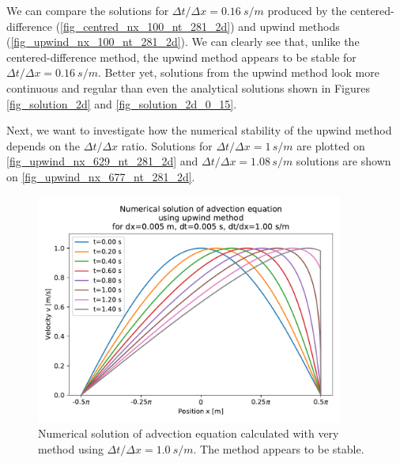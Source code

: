 We can compare the solutions for $\Delta t / \Delta x = 0.16 \ s/m$ produced by the centered-difference (\autoref{fig_centred_nx_100_nt_281_2d}) and upwind methods (\autoref{fig_upwind_nx_100_nt_281_2d}). We can clearly see that, unlike the centered-difference method, the upwind method appears to be stable for $\Delta t / \Delta x = 0.16 \ s/m$. Better yet, solutions from the upwind method look more continuous and regular than even the analytical solutions shown in Figures \ref{fig_solution_2d} and \ref{fig_solution_2d_0_15}.

Next, we want to investigate how the numerical stability of the upwind method depends on the $\Delta t / \Delta x$ ratio. Solutions for $\Delta t / \Delta x = 1 \, s/m$ are plotted on \autoref{fig_upwind_nx_629_nt_281_2d} and $\Delta t / \Delta x = 1.08 \, s/m$ solutions are shown on \autoref{fig_upwind_nx_677_nt_281_2d}.
\begin{figure}[H]
  \centering
  \includegraphics[width=0.9\textwidth]{figures/numerical/upwind_nx_629_nt_281_2d.pdf}
  \vspace*{-5mm}
  \caption{Numerical solution of advection equation calculated with very method using $\Delta t / \Delta x = 1.0 \ s/m$. The method appears to be stable.}
  \label{fig_upwind_nx_629_nt_281_2d}
  \vspace*{-10mm}
\end{figure}
